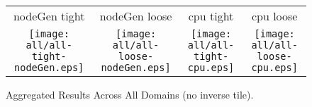 \documentclass[a4paper,landscape]{article}
\begin{document}
\begin{figure}[t]
    \centering
    \begin{tabular}{c c c c}
        nodeGen tight & nodeGen loose & cpu
        tight & cpu loose \\
       \begin{minipage}{\cpufigureplotwidth}
        \texttt{[image: all/all-tight-nodeGen.eps]}
        \end{minipage}&
        \begin{minipage}{\cpufigureplotwidth}
      \texttt{[image: all/all-loose-nodeGen.eps]}
      \end{minipage}&
        \begin{minipage}{\cpufigureplotwidth}
        \texttt{[image: all/all-tight-cpu.eps]}
        \end{minipage}&
        \begin{minipage}{\cpufigureplotwidth}
        \texttt{[image: all/all-loose-cpu.eps]}
        \end{minipage}
    \end{tabular}
    \caption{Aggregated Results Across All Domains (no inverse tile).}
\label{fig:all-domains}
\end{figure}
\end{document}
